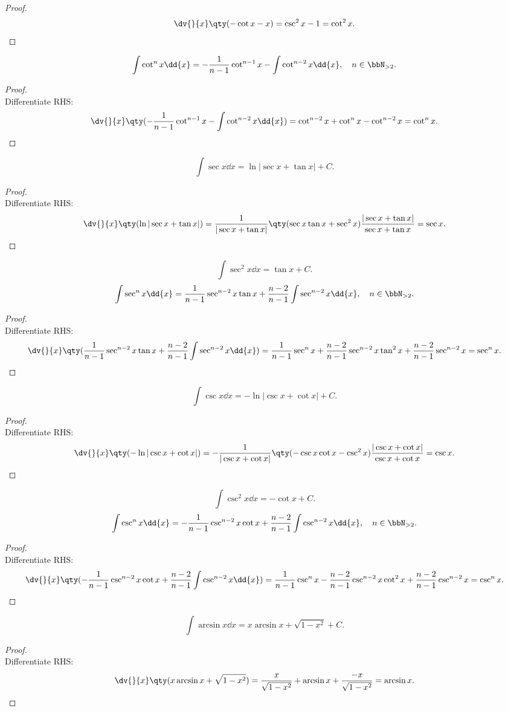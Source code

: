 \documentclass[a4paper,12pt]{report}
\begin{document}
\begin{itemize}
\begin{itemize}
\begin{proof}
    \[\dv{}{x}\qty(-\cot x-x)=\csc^2 x-1=\cot^2x.\]
\end{proof}
\[\int\cot^n x\dd{x}=-\frac{1}{n-1}\cot^{n-1}x-\int\cot^{n-2}x\dd{x},\quad n\in\bbN_{>2}.\]
\begin{proof}\mbox{}\\
    Differentiate RHS:
    \[\dv{}{x}\qty(-\frac{1}{n-1}\cot^{n-1}x-\int\cot^{n-2}x\dd{x})=\cot^{n-2}x+\cot^nx-\cot^{n-2}x=\cot^n x.\]
\end{proof}
\[\int\sec x\dd{x}=\ln|\sec x+\tan x|+C.\]
\begin{proof}\mbox{}\\
    Differentiate RHS:
    \[\dv{}{x}\qty(\ln|\sec x+\tan x|)=\frac{1}{|\sec x+\tan x|}\qty(\sec x\tan x+\sec^2 x)\frac{|\sec x+\tan x|}{\sec x+\tan x}=\sec x.\]
\end{proof}
\[\int\sec^2 x\dd{x}=\tan x+C.\]
\[\int\sec^n x\dd{x}=\frac{1}{n-1}\sec^{n-2}x\tan x+\frac{n-2}{n-1}\int\sec^{n-2}x\dd{x},\quad n\in\bbN_{>2}.\]
\begin{proof}\mbox{}\\
    Differentiate RHS:
    \[\dv{}{x}\qty(\frac{1}{n-1}\sec^{n-2}x\tan x+\frac{n-2}{n-1}\int\sec^{n-2}x\dd{x})=\frac{1}{n-1}\sec^nx+\frac{n-2}{n-1}\sec^{n-2}x\tan^2x+\frac{n-2}{n-1}\sec^{n-2}x=\sec^n x.\]
\end{proof}
\[\int\csc x\dd{x}=-\ln|\csc x+\cot x|+C.\]
\begin{proof}\mbox{}\\
    Differentiate RHS:
    \[\dv{}{x}\qty(-\ln|\csc x+\cot x|)=-\frac{1}{|\csc x+\cot x|}\qty(-\csc x\cot x-\csc^2 x)\frac{|\csc x+\cot x|}{\csc x+\cot x}=\csc x.\]
\end{proof}
\[\int\csc^2 x\dd{x}=-\cot x+C.\]
\[\int\csc^n x\dd{x}=-\frac{1}{n-1}\csc^{n-2}x\cot x+\frac{n-2}{n-1}\int\csc^{n-2}x\dd{x},\quad n\in\bbN_{>2}.\]
\begin{proof}\mbox{}\\
    Differentiate RHS:
    \[\dv{}{x}\qty(-\frac{1}{n-1}\csc^{n-2}x\cot x+\frac{n-2}{n-1}\int\csc^{n-2}x\dd{x})=\frac{1}{n-1}\csc^nx-\frac{n-2}{n-1}\csc^{n-2}x\cot^2x+\frac{n-2}{n-1}\csc^{n-2}x=\csc^nx.\]
\end{proof}
\[\int\arcsin x\dd{x}=x\arcsin x+\sqrt{1-x^2}+C.\]
\begin{proof}\mbox{}\\
    Differentiate RHS:
    \[\dv{}{x}\qty(x\arcsin x+\sqrt{1-x^2})=\frac{x}{\sqrt{1-x^2}}+\arcsin x+\frac{-x}{\sqrt{1-x^2}}=\arcsin x.\]
\end{proof}

\end{itemize}
\end{itemize}
\end{document}
